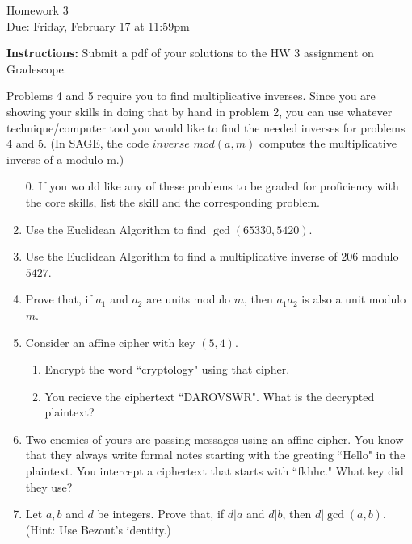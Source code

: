 \documentclass[12pt]{article}
\begin{document}
\begin{center}
{\Large Homework 3}\\
Due: Friday,  February 17 at 11:59pm\\


\end{center}
{\bf Instructions:} Submit a pdf of your solutions to the HW 3 assignment on Gradescope. 


 Problems 4 and 5 require you to find multiplicative inverses. Since you are showing your skills in doing that by hand in problem 2, you can use whatever technique/computer tool you would like to find the needed inverses for problems 4 and 5.  (In SAGE, the code $inverse\_mod(a,m)$ computes the multiplicative inverse of a modulo m.)

\begin{enumerate}
\item[0.] If you would like any of these problems to be graded for proficiency with the core skills, list the skill and the corresponding problem. 
\item Use the Euclidean Algorithm to find $\gcd(65330,5420)$.
\item Use the Euclidean Algorithm to find a multiplicative inverse of $206$ modulo $5427$. 
\item Prove that, if $a_1$ and $a_2$ are units modulo $m$, then $a_1a_2$ is also a unit modulo $m$. 
\item Consider an affine cipher with key $(5,4)$. 
\begin{enumerate}
\item Encrypt the word ``cryptology" using that cipher. 
\item You recieve the ciphertext ``DAROVSWR". What is the decrypted plaintext?
\end{enumerate}

\item Two enemies of yours are passing messages using an affine cipher. You know that they always write formal notes starting with the greating ``Hello" in the plaintext.  You intercept a ciphertext that starts with ``fkhhc." What key did they use?

\item Let $a,b$ and $d$ be integers. Prove that, if $d|a$ and $d|b$, then $d|\gcd(a,b)$. (Hint: Use Bezout's identity.)
\end{enumerate}
\end{document}
